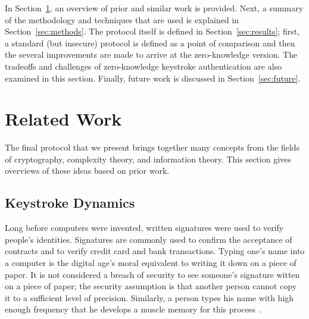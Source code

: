 \documentclass[11pt]{article}
\begin{document}
In Section~\ref{sec:related}, an overview of prior and similar work is provided. Next, a summary of the methodology and techniques that are used is explained in Section~\ref{sec:methods}. The protocol itself is defined in Section~\ref{sec:results}; first, a standard (but insecure) protocol is defined as a point of comparison and then the several improvements are made to arrive at the zero-knowledge version. The tradeoffs and challenges of zero-knowledge keystroke authentication are also examined in this section. Finally, future work is discussed in Section~\ref{sec:future}.

\section{Related Work}
\label{sec:related}
The final protocol that we present brings together many concepts from the fields of cryptography, complexity theory, and information theory. This section gives overviews of these ideas based on prior work.

\subsection{Keystroke Dynamics}
\label{sec:bg-keystroke}
Long before computers were invented, written signatures were used to verify people's identities. Signatures are commonly used to confirm the acceptance of contracts and to verify credit card and bank transactions. Typing one's name into a computer is the digital age's moral equivalent to writing it down on a piece of paper. It is not considered a breach of security to see someone's signature witten on a piece of paper; the security assumption is that another person cannot copy it to a sufficient level of precision. Similarly, a person types his name with high enough frequency that he develops a muscle memory for this process~\cite{monrose:authentication}.
\end{document}
